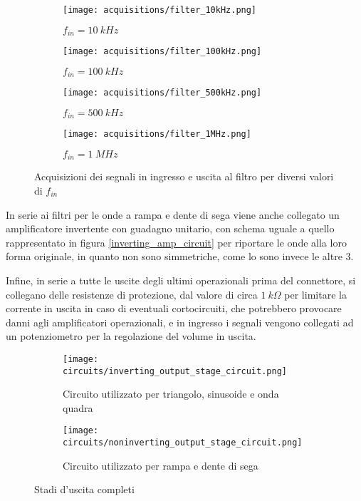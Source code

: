 \begin{figure}[H]
    \centering

    \begin{subfigure}{.5\textwidth}
        \centering
        \texttt{[image: acquisitions/filter\_10kHz.png]}
        \caption{$f_{in}=10\ kHz$}
        \label{acq_filter_10kHz}
    \end{subfigure}%
    \begin{subfigure}{.5\textwidth}
        \centering
        \texttt{[image: acquisitions/filter\_100kHz.png]}
        \caption{$f_{in}=100\ kHz$}
        \label{acq_filter_100kHz}
    \end{subfigure}
    \begin{subfigure}{.5\textwidth}
        \centering
        \texttt{[image: acquisitions/filter\_500kHz.png]}
        \caption{$f_{in}=500\ kHz$}
        \label{acq_filter_500kHz}
    \end{subfigure}%
    \begin{subfigure}{.5\textwidth}
        \centering
        \texttt{[image: acquisitions/filter\_1MHz.png]}
        \caption{$f_{in}=1\ MHz$}
        \label{acq_filter_MHz}
    \end{subfigure}

    \caption{Acquisizioni dei segnali in ingresso e uscita al filtro per diversi valori di $f_{in}$}
    \label{acq_filter}
\end{figure}

In serie ai filtri per le onde a rampa e dente di sega viene anche collegato un amplificatore
invertente con guadagno unitario, con schema uguale a quello rappresentato in figura \ref{inverting_amp_circuit}
per riportare le onde alla loro forma originale, in quanto non sono simmetriche, come lo sono
invece le altre 3.

Infine, in serie a tutte le uscite degli ultimi operazionali prima del connettore, si collegano
delle resistenze di protezione, dal valore di circa $1\ k\Omega$ per limitare la corrente in
uscita in caso di eventuali cortocircuiti, che potrebbero provocare danni agli amplificatori
operazionali, e in ingresso i segnali vengono collegati ad un potenziometro per la regolazione
del volume in uscita.

\begin{figure}[H]
    \centering

    \begin{subfigure}{\textwidth}
        \centering
        \texttt{[image: circuits/inverting\_output\_stage\_circuit.png]}
        \caption{Circuito utilizzato per triangolo, sinusoide e onda quadra}
        \label{inverting_output_stage_circuit}
    \end{subfigure}
    \begin{subfigure}{\textwidth}
        \centering
        \texttt{[image: circuits/noninverting\_output\_stage\_circuit.png]}
        \caption{Circuito utilizzato per rampa e dente di sega}
        \label{noninverting_output_stage_circuit}
    \end{subfigure}

    \caption{Stadi d'uscita completi}
    \label{output_stages}
\end{figure}

